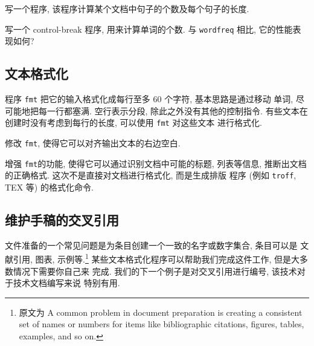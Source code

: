 \begin{exercise}
    写一个程序, 该程序计算某个文档中句子的个数及每个句子的长度.
\end{exercise}

\begin{exercise}
    写一个 control-break 程序, 用来计算单词的个数. 与 \texttt{wordfreq} 
    相比, 它的性能表现如何?
\end{exercise}

\subsection{文本格式化}
\label{subsec:text_formatting}

程序 \texttt{fmt} 把它的输入格式化成每行至多 60 个字符, 基本思路是通过移动
单词, 尽可能地把每一行都塞满. 空行表示分段, 除此之外没有其他的控制指令.
有些文本在创建时没有考虑到每行的长度, 可以使用 \texttt{fmt} 对这些文本
进行格式化.

\begin{exercise}
    修改 \texttt{fmt}, 使得它可以对齐输出文本的右边空白.
\end{exercise}

\begin{exercise}
    增强 \texttt{fmt}的功能, 使得它可以通过识别文档中可能的标题, 列表等信息,
    推断出文档的正确格式. 这次不是直接对文档进行格式化, 而是生成排版
    程序 (例如 \texttt{troff}, TEX 等) 的格式化命令.
\end{exercise}

\subsection{维护手稿的交叉引用}
\label{subsec:maintaining_cross_reference_in_manuscripts}

文件准备的一个常见问题是为条目创建一个一致的名字或数字集合, 条目可以是
文献引用, 图表, 示例等.\footnote{原文为 A common problem in document
    preparation is creating a consistent set of names or numbers for items
like bibliographic citations, figures, tables, examples, and so on.}
某些文本格式化程序可以帮助我们完成这件工作, 但是大多数情况下需要你自己来
完成. 我们的下一个例子是对交叉引用进行编号, 该技术对于技术文档编写来说
特别有用.

